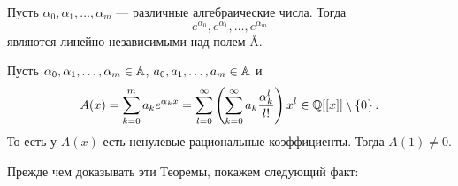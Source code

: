 \begin{ntheorem}
\label{thm:IV-11}
    Пусть $\alpha_0, \alpha_1, \dots, \alpha_m$ --- различные алгебраические числа. Тогда
    \[
        e^{\alpha_0}, e^{\alpha_1}, \dots, e^{\alpha_m}
    \]
    являются линейно независимыми над полем \AA.
\end{ntheorem}

\begin{ntheorem}
\label{thm:IV-12}
    Пусть ${\alpha_0, \alpha_1, \dots, \alpha_m \in \AA}$, $a_0, a_1, \dots, a_m \in \AA$ и
    \[
        A(x) = \sum_{k=0}^{m} a_k e^{\alpha_{k}x} 
        = \sum_{l=0}^{\infty} \left( \sum_{k=0}^{\infty} a_k \frac{\alpha_k^l}{l!} \right)x^l \in \QQ[[x]] \setminus \left\{ 0 \right\}.
    \]
    То есть у $A(x)$ есть ненулевые рациональные коэффициенты. Тогда $A(1) \ne 0$.
\end{ntheorem}

Прежде чем доказывать эти Теоремы, покажем следующий факт:

